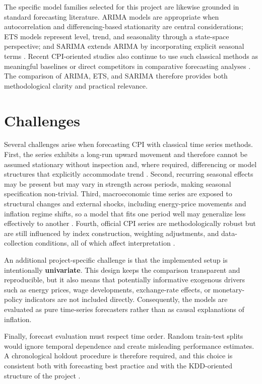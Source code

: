 The specific model families selected for this project are likewise grounded in standard forecasting literature. ARIMA models are appropriate when autocorrelation and differencing-based stationarity are central considerations; ETS models represent level, trend, and seasonality through a state-space perspective; and SARIMA extends ARIMA by incorporating explicit seasonal terms \cite{Box2015,Hyndman2021,Shumway2017}. Recent CPI-oriented studies also continue to use such classical methods as meaningful baselines or direct competitors in comparative forecasting analyses \cite{Hu2025,Mchukwa2025,Nalici2025}. The comparison of ARIMA, ETS, and SARIMA therefore provides both methodological clarity and practical relevance.

\section{Challenges}
Several challenges arise when forecasting CPI with classical time series methods. First, the series exhibits a long-run upward movement and therefore cannot be assumed stationary without inspection and, where required, differencing or model structures that explicitly accommodate trend \cite{Box2015,Hyndman2021}. Second, recurring seasonal effects may be present but may vary in strength across periods, making seasonal specification non-trivial. Third, macroeconomic time series are exposed to structural changes and external shocks, including energy-price movements and inflation regime shifts, so a model that fits one period well may generalize less effectively to another \cite{StockWatson1999,DestatisEnergyPriceTrends2023}. Fourth, official CPI series are methodologically robust but are still influenced by index construction, weighting adjustments, and data-collection conditions, all of which affect interpretation \cite{DestatisCPIQuality2023,DestatisCovidCPI2022}.

An additional project-specific challenge is that the implemented setup is intentionally \textbf{univariate}. This design keeps the comparison transparent and reproducible, but it also means that potentially informative exogenous drivers such as energy prices, wage developments, exchange-rate effects, or monetary-policy indicators are not included directly. Consequently, the models are evaluated as pure time-series forecasters rather than as causal explanations of inflation.

Finally, forecast evaluation must respect time order. Random train-test splits would ignore temporal dependence and create misleading performance estimates. A chronological holdout procedure is therefore required, and this choice is consistent both with forecasting best practice and with the KDD-oriented structure of the project \cite{Fayyad:1996,Hyndman2021,Armstrong:2001}.

